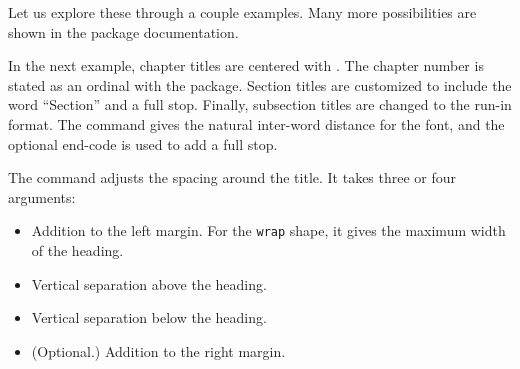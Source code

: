 Let us explore these through a couple examples.
Many more possibilities are shown in the package documentation.

In the next example, chapter titles are centered with .
The chapter number is stated as an ordinal with the  package.
Section titles are customized to include the word ``Section'' and a full stop.
Finally, subsection titles are changed to the run-in format.
The  command gives the natural inter-word distance for the font,
and the optional end-code is used to add a full stop.
%
%

The  command adjusts the spacing around the title.
It takes three or four arguments:
\begin{itemize}
\item Addition to the left margin.
    For the \verb|wrap| shape, it gives the maximum width of the heading.
\item Vertical separation above the heading.
\item Vertical separation below the heading.
\item (Optional.) Addition to the right margin.
\end{itemize}

